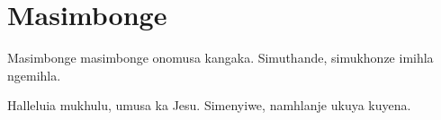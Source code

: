\starttocol
\chapter{Masimbonge}
\nexttocol
\hfill{\it }
\stoptocol
\starttocol
\startlines
{\sc Masimbonge} masimbonge
onomusa kangaka.
Simuthande, simukhonze
imihla ngemihla.

Halleluia mukhulu,
umusa ka Jesu.
Simenyiwe, namhlanje
ukuya kuyena.
\stoplines
\nexttocol

\stoptocol
